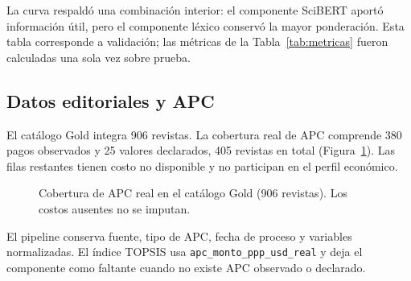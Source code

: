 \documentclass[12pt,a4paper]{article}
\begin{document}
La curva respaldó una combinación interior: el componente SciBERT aportó información útil, pero el componente léxico conservó la mayor ponderación. Esta tabla corresponde a validación; las métricas de la Tabla~\ref{tab:metricas} fueron calculadas una sola vez sobre prueba.

\subsection{Datos editoriales y APC}
El catálogo Gold integra 906 revistas. La cobertura real de APC comprende 380 pagos observados y 25 valores declarados, 405 revistas en total (Figura~\ref{fig:apc}). Las filas restantes tienen costo no disponible y no participan en el perfil económico.

\begin{figure}[htbp]
\centering
{}
\caption{Cobertura de APC real en el catálogo Gold (906 revistas). Los costos ausentes no se imputan.}
\label{fig:apc}
\end{figure}

El pipeline conserva fuente, tipo de APC, fecha de proceso y variables normalizadas. El índice TOPSIS usa \texttt{apc\_monto\_ppp\_usd\_real} y deja el componente como faltante cuando no existe APC observado o declarado.
\end{document}
